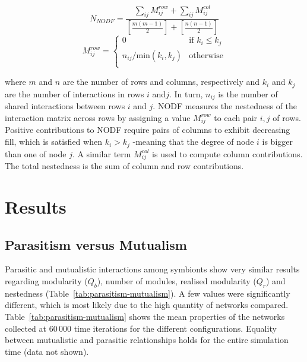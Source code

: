 \documentclass[fleqn,10pt]{wlscirep}
\begin{document}
\begin{equation}
N_{NODF}=\frac{\sum_{ij}M_{ij}^{row}+\sum_{ij}M_{ij}^{col}}{[\frac{m(m-1)}{2}]+[\frac{n(n-1)}{2}]}
\end{equation}
\begin{equation}
M_{ij}^{row} = \begin{cases} 0 & \text{if $k_i \leq k_j$}\\ 
			 n_{ij}/ \text{min$(k_i,k_j)$} & \text{otherwise}\\
\end{cases}
\end{equation}

where $m$ and $n$ are the number of rows and columns, respectively and $k_i$ and $k_j$ are the number of interactions in rows $i$ and$j$. In turn, $n_{ij}$ is the number of shared interactions between rows $i$ and $j$. NODF measures the nestedness of the interaction matrix across rows by assigning a value $M_{ij}^{row}$ to each pair $i,j$ of rows. Positive contributions to NODF require pairs of columns to exhibit decreasing fill, which is satisfied when $k_i>k_j$ -meaning that the degree of node $i$ is bigger than one of node $j$. A similar term $M_{ij}^{col}$ is used to compute column contributions. The total nestedness is the sum of column and row contributions. 


\section{Results}
\label{sec:res}
\subsection{Parasitism versus Mutualism}
\label{sec:res:para}
Parasitic and mutualistic interactions among symbionts show very similar results regarding modularity ($Q_b$), number of modules, realised modularity ($Q_r$) and nestedness (Table~\ref{tab:parasitism-mutualism}). A few values were significantly different, which is most likely due to the high quantity of networks compared. Table~\ref{tab:parasitism-mutualism} shows the mean properties of the networks collected at  $60\,000$ time iterations for the different configurations. Equality between mutualistic and parasitic relationships holds for the entire simulation time (data not shown).


 
\end{document}
